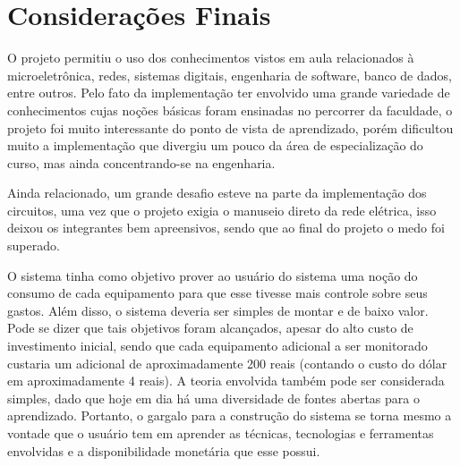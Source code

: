 \chapter{Considerações Finais}
\label{Cap:consideracoes_finais}

O projeto permitiu o uso dos conhecimentos vistos em aula relacionados à microeletrônica, redes, sistemas digitais, engenharia de software, banco de dados, entre outros. Pelo fato da implementação ter envolvido uma grande variedade de conhecimentos cujas noções básicas foram ensinadas no percorrer da faculdade, o projeto foi muito interessante do ponto de vista de aprendizado, porém dificultou muito a implementação que divergiu um pouco da área de especialização do curso, mas ainda concentrando-se na engenharia.

Ainda relacionado, um grande desafio esteve na parte da implementação dos circuitos, uma vez que o projeto exigia o manuseio direto da rede elétrica, isso deixou os integrantes bem apreensivos, sendo que ao final do projeto o medo foi superado.

O sistema tinha como objetivo prover ao usuário do sistema uma noção do consumo de cada equipamento para que esse tivesse mais controle sobre seus gastos. Além disso, o sistema deveria ser simples de montar e de baixo valor. Pode se dizer que tais objetivos foram alcançados, apesar do alto custo de investimento inicial, sendo que cada equipamento adicional a ser monitorado custaria um adicional de aproximadamente 200 reais (contando o custo do dólar em aproximadamente 4 reais). A teoria envolvida também pode ser considerada simples, dado que hoje em dia há uma diversidade de fontes abertas para o aprendizado. Portanto, o gargalo para a construção do sistema se torna mesmo a vontade que o usuário tem em aprender as técnicas, tecnologias e ferramentas envolvidas e a disponibilidade monetária que esse possui.